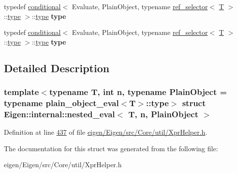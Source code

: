 \begin{DoxyCompactItemize}
typedef \hyperlink{struct_eigen_1_1internal_1_1conditional}{conditional}$<$ Evaluate, Plain\+Object, typename \hyperlink{struct_eigen_1_1internal_1_1ref__selector}{ref\+\_\+selector}$<$ \hyperlink{group___sparse_core___module}{T} $>$\+::\hyperlink{class_eigen_1_1internal_1_1_tensor_lazy_evaluator_writable}{type} $>$\+::\hyperlink{class_eigen_1_1internal_1_1_tensor_lazy_evaluator_writable}{type} {\bfseries type}
\item 
\mbox{\label{struct_eigen_1_1internal_1_1nested__eval_a3e0ad119cd1fee5aba6b98cb7e7ad2fe}} 
typedef \hyperlink{struct_eigen_1_1internal_1_1conditional}{conditional}$<$ Evaluate, Plain\+Object, typename \hyperlink{struct_eigen_1_1internal_1_1ref__selector}{ref\+\_\+selector}$<$ \hyperlink{group___sparse_core___module}{T} $>$\+::\hyperlink{class_eigen_1_1internal_1_1_tensor_lazy_evaluator_writable}{type} $>$\+::\hyperlink{class_eigen_1_1internal_1_1_tensor_lazy_evaluator_writable}{type} {\bfseries type}
\end{DoxyCompactItemize}


\subsection{Detailed Description}
\subsubsection*{template$<$typename T, int n, typename Plain\+Object = typename plain\+\_\+object\+\_\+eval$<$\+T$>$\+::type$>$\newline
struct Eigen\+::internal\+::nested\+\_\+eval$<$ T, n, Plain\+Object $>$}



Definition at line \hyperlink{eigen_2_eigen_2src_2_core_2util_2_xpr_helper_8h_source_l00437}{437} of file \hyperlink{eigen_2_eigen_2src_2_core_2util_2_xpr_helper_8h_source}{eigen/\+Eigen/src/\+Core/util/\+Xpr\+Helper.\+h}.



The documentation for this struct was generated from the following file\+:\begin{DoxyCompactItemize}
\item 
eigen/\+Eigen/src/\+Core/util/\+Xpr\+Helper.\+h\end{DoxyCompactItemize}
